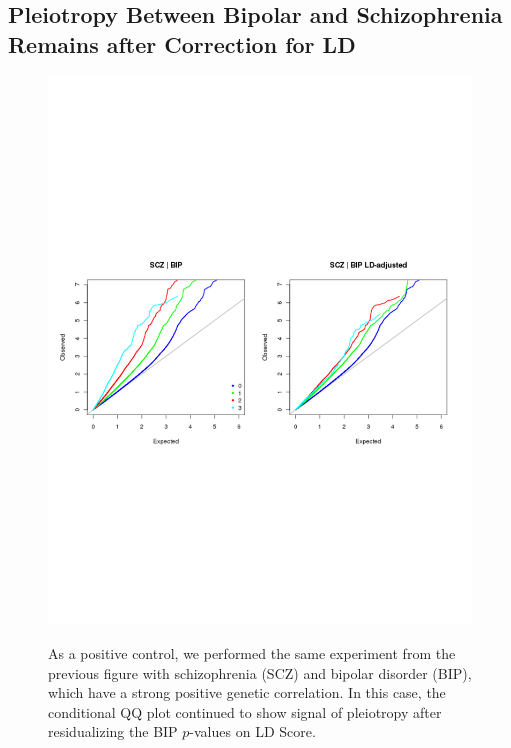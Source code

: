 \documentclass[11pt]{article}
\numberwithin{equation}{section}
\numberwithin{definition}{section}
\numberwithin{thm}{section}
\numberwithin{lemma}{section}
\numberwithin{prop}{section}
\numberwithin{cor}{section}
\numberwithin{hyp}{section}
\begin{document}
\subsection{Pleiotropy Between Bipolar and Schizophrenia Remains after Correction for LD}
\begin{figure}[!ht]

\begin{centering}
    \includegraphics[scale=0.6]{figs/qq_BIP.pdf}
         \label{qq_bip}
         
As a positive control, we performed the same experiment from the previous figure with schizophrenia (SCZ) and 
bipolar disorder (BIP), which have a strong positive genetic correlation. 
In this case, the conditional QQ plot continued to show signal of pleiotropy 
after residualizing the BIP $p$-values on LD Score.

\end{centering}
\end{figure}
\newpage
\end{document}
